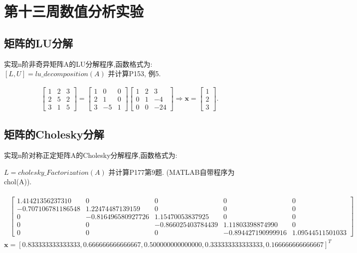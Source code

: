 \section{第十三周数值分析实验}
\subsection{矩阵的LU分解}
\begin{ex}
	实现n阶非奇异矩阵A的LU分解程序,函数格式为:
	$[L,U]=lu\_decomposition(A)$
	并计算P153, 例5.
\end{ex}


\qa 
\begin{eqnarray*}
	\begin{bmatrix}
		1 & 2 & 3\\
		2 & 5 & 2\\
		3 & 1 & 5
	\end{bmatrix}
	=\begin{bmatrix}
		1&0&0\\
		2&1&0\\
		3&-5&1
	\end{bmatrix}
	\begin{bmatrix}
		1&2&3\\
		0&1&-4\\
		0&0&-24
	\end{bmatrix}
	\Longrightarrow
	\boldsymbol{x}=
	\begin{bmatrix}
		1\\2\\3
	\end{bmatrix}.
\end{eqnarray*}

\subsection{矩阵的Cholesky分解}
\begin{ex}
	实现n阶对称正定矩阵A的Cholesky分解程序,函数格式为:
	
	$L=cholesky\_Factorization (A)$
	并计算P177第9题. (MATLAB自带程序为chol(A)).
\end{ex}


\qa 
\scriptsize{
	\begin{align*}
		\begin{array}{lc}
			\begin{bmatrix}
				1.41421356237310&0&0&0&0\\
				-0.707106781186548&1.22474487139159&0&0&0\\
				0&-0.816496580927726&1.15470053837925&0&0\\
				0&0&-0.866025403784439&1.11803398874990&0\\
				0&0&0&-0.894427190999916&1.09544511501033
			\end{bmatrix}
		\end{array}
	\end{align*}
}
$\boldsymbol{x}=\left[0.833333333333333,0.666666666666667,0.500000000000000,0.333333333333333,0.166666666666667\right]^T$